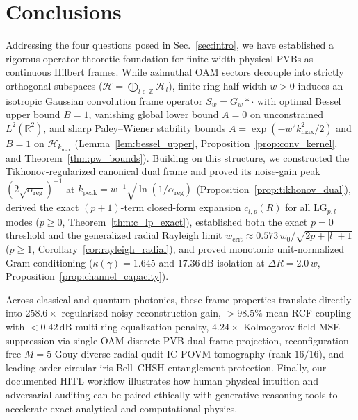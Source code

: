 \documentclass[aps,pra,reprint,amsmath,amssymb,floatfix,longbibliography]{revtex4-2}
\providecommand{\abs}[1]{\lvert#1\rvert}
\begin{document}
\section{Conclusions}
\label{sec:conclusions}

Addressing the four questions posed in Sec.~\ref{sec:intro}, we have established a rigorous operator-theoretic foundation for finite-width physical PVBs as continuous Hilbert frames. While azimuthal OAM sectors decouple into strictly orthogonal subspaces ($\mathcal{H} = \bigoplus_{l\in\mathbb{Z}}\mathcal{H}_l$), finite ring half-width $w > 0$ induces an isotropic Gaussian convolution frame operator $S_w = G_w * \cdot$ with optimal Bessel upper bound $B = 1$, vanishing global lower bound $A = 0$ on unconstrained $L^2(\mathbb{R}^2)$, and sharp Paley--Wiener stability bounds $A = \exp(-w^2 k_{\max}^2/2)$ and $B = 1$ on $\mathcal{H}_{k_{\max}}$ (Lemma~\ref{lem:bessel_upper}, Proposition~\ref{prop:conv_kernel}, and Theorem~\ref{thm:pw_bounds}). Building on this structure, we constructed the Tikhonov-regularized canonical dual frame and proved its noise-gain peak $(2\sqrt{\alpha_{\mathrm{reg}}})^{-1}$ at $k_{\mathrm{peak}} = w^{-1}\sqrt{\ln(1/\alpha_{\mathrm{reg}})}$ (Proposition~\ref{prop:tikhonov_dual}), derived the exact $(p+1)$-term closed-form expansion $c_{l,p}(R)$ for all $\mathrm{LG}_{p,l}$ modes ($p \ge 0$, Theorem~\ref{thm:c_lp_exact}), established both the exact $p = 0$ threshold and the generalized radial Rayleigh limit $w_{\mathrm{crit}} \approx 0.573\,w_0/\sqrt{2p+\abs{l}+1}$ ($p \ge 1$, Corollary~\ref{cor:rayleigh_radial}), and proved monotonic unit-normalized Gram conditioning ($\kappa(\gamma) = 1.645$ and $17.36\,\mathrm{dB}$ isolation at $\Delta R = 2.0\,w$, Proposition~\ref{prop:channel_capacity}).

Across classical and quantum photonics, these frame properties translate directly into $258.6\times$ regularized noisy reconstruction gain, $>98.5\%$ mean RCF coupling with $<0.42\,\mathrm{dB}$ multi-ring equalization penalty, $4.24\times$ Kolmogorov field-MSE suppression via single-OAM discrete PVB dual-frame projection, reconfiguration-free $M = 5$ Gouy-diverse radial-qudit IC-POVM tomography (rank $16/16$), and leading-order circular-iris Bell--CHSH entanglement protection. Finally, our documented HITL workflow illustrates how human physical intuition and adversarial auditing can be paired ethically with generative reasoning tools to accelerate exact analytical and computational physics.
\end{document}
